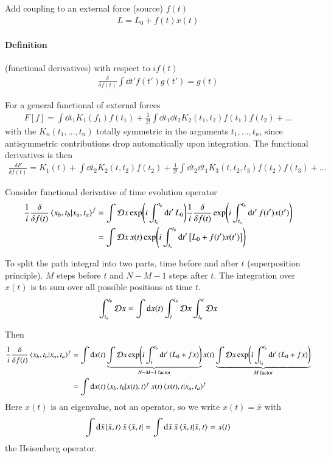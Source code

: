 Add coupling to an external force (source) $f(t)$
\begin{align}
   L = L_0 + f(t) x(t)
\end{align}

\paragraph{Definition} (functional derivatives) with respect to $if(t)$
\begin{align}
   \frac{\delta}{\delta f(t)} \int \dd{t'} f(t') g(t') = g(t)
\end{align}

For a general functional of external forces
\begin{align}
   F[f] = \int \dd{t_1} K_1(f_1) f(t_1) + \frac{1}{2!} \int \dd{t_1} \dd{t_2} K_2(t_1, t_2) f(t_1) f(t_2)  + \dots
\end{align}
with the $K_n(t_1, \dots, t_n)$ totally symmetric in the arguments $t_1, \dots , t_n$, since antisymmetric contributions drop automatically upon integration. The functional derivatives is then
\begin{align}
   \frac{\delta F}{\delta f(t)} = K_1(t) + \int \dd{t_2} K_2 (t, t_2) f(t_2) + \frac{1}{2!} \int \dd{t_2} \dd{t_1} K_3(t, t_2, t_3) f(t_2) f(t_3) + \dots
\end{align}

Consider functional derivative of time evolution operator
\begin{align*}
   \frac{1}{i} \frac{\delta}{\delta f(t)} \braket{x_b, t_b | x_a, t_a}^f  
   &= \int \mathcal{D} x \exp(i \int^{t_b}_{t_a} \dd{t'}L_0) \frac{1}{i} \frac{\delta}{\delta f(t)} \exp(i\int^{t_b}_{t_a}\dd{t'}f(t')x(t')) \\
   &= \int \mathcal{D} x \, x(t) \exp(i\int^{t_b}_{t_a} \dd{t'} \left[ L_0 + f(t') x(t') \right] )
\end{align*}

To split the path integral into two parts, time before and after $t$ (superposition principle). $M$ steps before $t$ and $N-M-1$ steps after $t$. The integration over $x(t)$ is to sum over all possible positions at time $t$.
\begin{align*}
   \int^{t_b}_{t_a} \mathcal{D} x  = \int \dd{x(t)} \int^{t_b}_t \mathcal{D} x \int^t_{t_a} \mathcal{D} x
\end{align*}

Then
\begin{align*}
   \frac{1}{i} \frac{\delta}{\delta f(t)} \braket{x_b, t_b | x_a, t_a}^f  &= \int \dd{x(t)} \underbrace{\int \mathcal{D} x \exp(i \int^{t_b}_{t} \dd{t'} (L_0 + f x))}_{N-M-1 \text{ factor}} x(t) \underbrace{\int \mathcal{D} x \exp(i\int^{t_b}_{t_a} \dd{t'} (L_0 + fx))}_{M \text{ factor}} \\
                                                                        &= \int \dd{x(t)} \braket{x_b, t_b | x(t), t}^f x(t) \braket{x(t), t | x_a, t_a}^f
\end{align*}
Here $x(t)$ is an eigenvalue, not an operator, so we write $x(t) = \bar{x}$ with 
\begin{align*}
\int \dd{\bar{x}} \ket{\bar{x}, t} \bar{x} \bra{\bar{x}, t} = \int \dd{\bar{x}} \bar{x} \braket{\bar{x}, t | \bar{x}, t}  = x(t)
\end{align*}
the Heisenberg operator.

